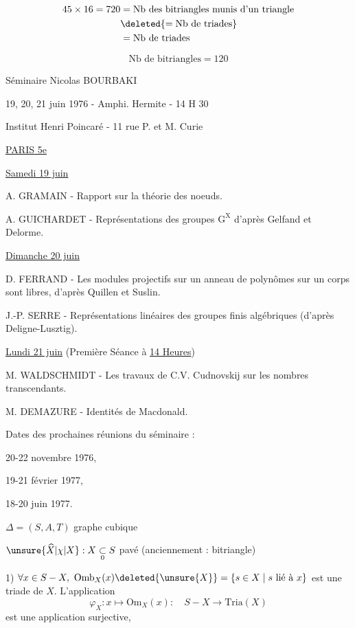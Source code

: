 \[
\begin{aligned}
45\times16=720&=\text{Nb des bitriangles munis d'un triangle}\\
&\deleted{=\text{Nb de triades}}\\
&=\text{Nb de triades}
\end{aligned}
\]

\[
\text{Nb de bitriangles}=120
\]


Séminaire Nicolas BOURBAKI

19, 20, 21 juin 1976 - Amphi. Hermite - 14 H 30

Institut Henri Poincaré - 11 rue P. et M. Curie

\uline{PARIS 5e}

\uline{Samedi 19 juin}

A. GRAMAIN - Rapport sur la théorie des noeuds.

A. GUICHARDET - Représentations des groupes $\mathrm G^{\mathrm X}$ d'après Gelfand et Delorme.

\uline{Dimanche 20 juin}

D. FERRAND - Les modules projectifs sur un anneau de polynômes sur un corps sont libres, d'après Quillen et Suslin.

J.-P. SERRE - Représentations linéaires des groupes finis \textquotedbl{}algébriques\textquotedbl{} (d'après Deligne-Lusztig).

\uline{Lundi 21 juin} (Première Séance à \uline{14 Heures})

M. WALDSCHMIDT - Les travaux de C.V. \handwritten{\rlap{\v{\phantom{C}}}}Cudnovskij sur les nombres transcendants.

M. DEMAZURE - Identités de Macdonald.

Dates des prochaines réunions du séminaire :

20-22 novembre 1976,

19-21 février 1977,

18-20 juin 1977.


$\Delta=(S,A,T)$ graphe cubique

$\unsure{\widehat X|\chi|X}:X\mathrel{\underset{0}{\subset}}S$ pavé (anciennement : bitriangle)

1) $\forall x\in S-X,\ \mathrm{Omb}_X(x)\deleted{\unsure{X}}=\{s\in X\mid s\ \text{lié à }x\}$ est une triade de $X$. L'application
\[
\varphi_X:x\longmapsto\mathrm{Om}_X(x):\quad S-X\longrightarrow\mathrm{Tria}(X)
\]
est une application surjective, 


